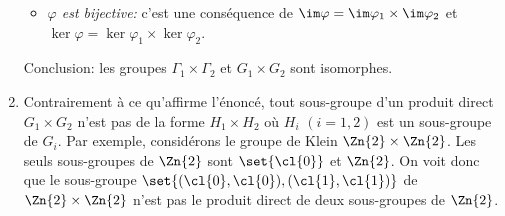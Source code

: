 \begin{enumerate}
\begin{itemize}
      \item
        \textit{$\varphi$ est bijective:}
        c'est une conséquence de $\im \varphi = \im \varphi_1 \times \im \varphi_2$ et $\ker \varphi = \ker \varphi_1 \times \ker \varphi_2$.
    \end{itemize}

    Conclusion: les groupes $\Gamma_1\times \Gamma_2$ et $G_1\times G_2$ sont isomorphes.

  \item
    Contrairement à ce qu'affirme l'énoncé, tout sous-groupe d'un produit direct $G_1\times G_2$ n'est pas de la forme $H_1\times H_2$ où $H_i$ $(i=1,2)$ est un sous-groupe de $G_i$.
    Par exemple, considérons le groupe de Klein $\Zn{2}\times \Zn{2}$.
    Les seuls sous-groupes de $\Zn{2}$ sont $\set{\cl{0}}$ et $\Zn{2}$.
    On voit donc que le sous-groupe $\set{(\cl{0},\cl{0}), (\cl{1},\cl{1})}$ de $\Zn{2}\times\Zn{2}$ n'est pas le produit direct de deux sous-groupes de $\Zn{2}$.
\end{enumerate}
